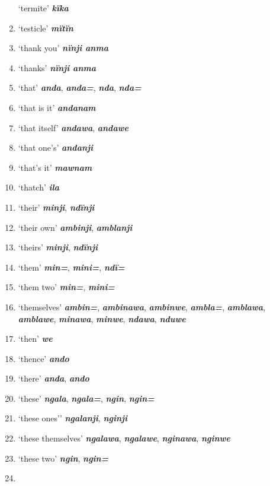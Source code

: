 \begin{enumerate}[noitemsep, label={}, align=left, widest=190, labelsep=1ex,leftmargin=*,itemindent=-10pt]
‘termite’ \textbf{\textit{kïka}} \item
‘testicle’ \textbf{\textit{mïtïn}} \item
‘thank you’ \textbf{\textit{nïnji anma}} \item
‘thanks’ \textbf{\textit{nïnji anma}} \item
‘that’ \textbf{\textit{anda}}, \textbf{\textit{anda=}}, \textbf{\textit{nda}}, \textbf{\textit{nda=}} \item
‘that is it’ \textbf{\textit{andanam}} \item
‘that itself’ \textbf{\textit{andawa}}, \textbf{\textit{andawe}} \item
‘that one’s’ \textbf{\textit{andanji}} \item
‘that’s it’ \textbf{\textit{mawnam}} \item
‘thatch’ \textbf{\textit{ila}} \item
‘their’ \textbf{\textit{minji}}, \textbf{\textit{ndïnji}} \item
‘their own’ \textbf{\textit{ambinji}}, \textbf{\textit{amblanji}} \item
‘theirs’ \textbf{\textit{minji}}, \textbf{\textit{ndïnji}} \item
‘them’ \textbf{\textit{min=}}, \textbf{\textit{mini=}}, \textbf{\textit{ndï=}} \item
‘them two’ \textbf{\textit{min=}}, \textbf{\textit{mini=}} \item
‘themselves’ \textbf{\textit{ambin=}}, \textbf{\textit{ambinawa}}, \textbf{\textit{ambinwe}}, \textbf{\textit{ambla=}}, \textbf{\textit{amblawa}}, \textbf{\textit{amblawe}}, \linebreak \textbf{\textit{minawa}}, \textbf{\textit{minwe}}, \textbf{\textit{ndawa}}, \textbf{\textit{nduwe}} \item
‘then’ \textbf{\textit{we}} \item
‘thence’ \textbf{\textit{ando}} \item
‘there’ \textbf{\textit{anda}}, \textbf{\textit{ando}} \item
‘these’ \textbf{\textit{ngala}}, \textbf{\textit{ngala=}}, \textbf{\textit{ngin}}, \textbf{\textit{ngin=}} \item
‘these ones’’ \textbf{\textit{ngalanji}}, \textbf{\textit{nginji}} \item
‘these themselves’ \textbf{\textit{ngalawa}}, \textbf{\textit{ngalawe}}, \textbf{\textit{nginawa}}, \textbf{\textit{nginwe}} \item
‘these two’ \textbf{\textit{ngin}}, \textbf{\textit{ngin=}} \item

\end{enumerate}
